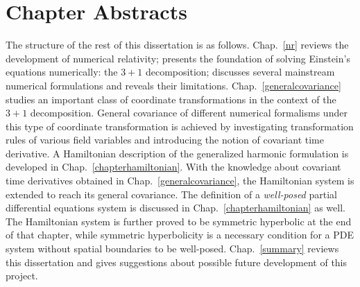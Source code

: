 \section{Chapter Abstracts}\label{abstracts}
The structure of the rest of this dissertation is as follows. Chap.~\ref{nr} reviews the development of numerical relativity; presents the foundation of solving Einstein's equations numerically: the $3 + 1$ decomposition; discusses several mainstream numerical formulations and reveals their limitations. Chap.~\ref{generalcovariance} studies an important class of coordinate transformations in the context of the $3 + 1$ decomposition. General covariance of different numerical formalisms under this type of coordinate transformation is achieved by investigating transformation rules of various field variables and introducing the notion of covariant time derivative. A Hamiltonian description of the generalized harmonic formulation is developed in Chap.~\ref{chapterhamiltonian}. With the knowledge about covariant time derivatives obtained in Chap.~\ref{generalcovariance}, the Hamiltonian system is extended to reach its general covariance. The definition of a {\em well-posed} partial differential equations system is discussed in Chap.~\ref{chapterhamiltonian} as well. The Hamiltonian system is further proved to be symmetric hyperbolic at the end of that chapter, while symmetric hyperbolicity is a necessary condition for a PDE system without spatial boundaries to be well-posed. Chap.~\ref{summary} reviews this dissertation and gives suggestions about possible future development of this project. 
